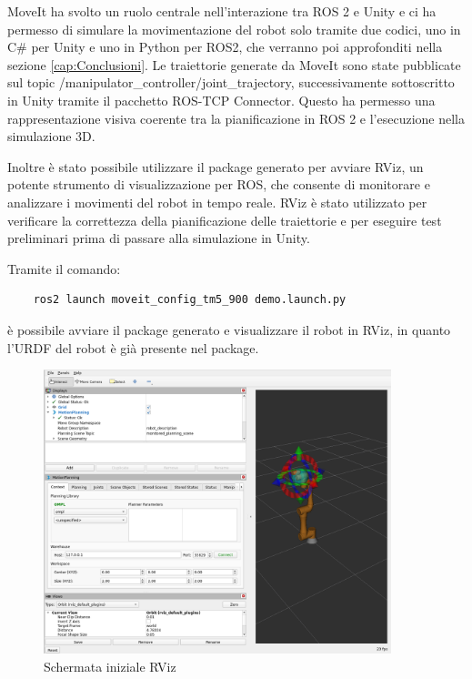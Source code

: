 \documentclass[11pt]{report}
\begin{document}
MoveIt ha svolto un ruolo centrale nell’interazione tra ROS 2 e Unity e ci ha permesso di simulare la movimentazione del robot solo tramite due codici, uno in C\# per Unity e uno in Python per ROS2, che verranno poi approfonditi nella sezione \ref{cap:Conclusioni}. Le traiettorie generate da MoveIt sono state pubblicate sul topic /manipulator\_controller/joint\_trajectory, successivamente sottoscritto in Unity tramite il pacchetto ROS-TCP Connector. Questo ha permesso una rappresentazione visiva coerente tra la pianificazione in ROS 2 e l’esecuzione nella simulazione 3D.

Inoltre è stato possibile utilizzare il package generato per avviare RViz, un potente strumento di visualizzazione per ROS, che consente di monitorare e analizzare i movimenti del robot in tempo reale. RViz è stato utilizzato per verificare la correttezza della pianificazione delle traiettorie e per eseguire test preliminari prima di passare alla simulazione in Unity.

Tramite il comando:
\begin{verbatim}
    ros2 launch moveit_config_tm5_900 demo.launch.py
\end{verbatim}

è possibile avviare il package generato e visualizzare il robot in RViz, in quanto l'URDF del robot è già presente nel package.

\begin{figure}[H]
    \centering
    \includegraphics[width=0.9\textwidth]{images/rviz_1.PNG}
    \caption{Schermata iniziale RViz}
    \label{fig:rviz_1}
\end{figure}
\end{document}
